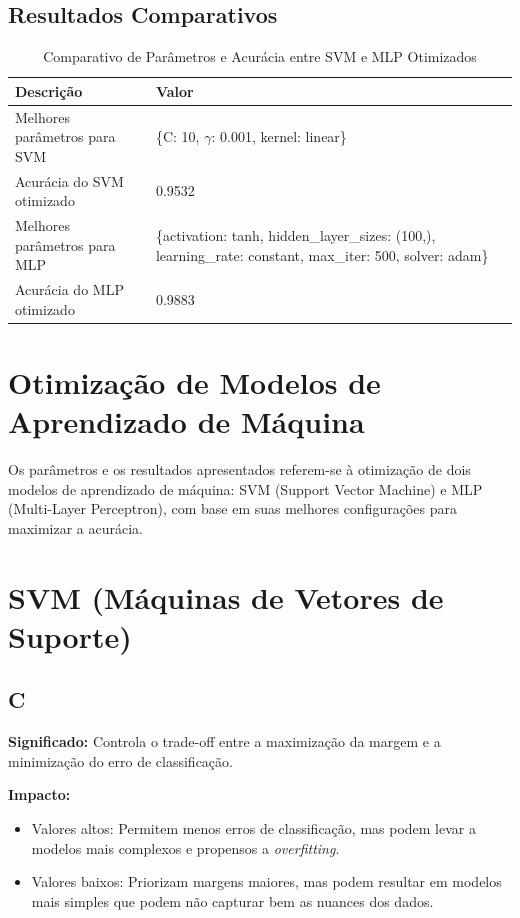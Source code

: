 \documentclass[12pt,a4paper,oneside,openany]{article}
\begin{document}
\subsection{Resultados Comparativos}

\begin{table}[ht]
\centering
\begin{tabularx}{\textwidth}{|l|X|}
\hline
\textbf{Descrição} & \textbf{Valor} \\
\hline
Melhores parâmetros para SVM & \{C: 10, $\gamma$: 0.001, kernel: linear\} \\
Acurácia do SVM otimizado & 0.9532 \\
Melhores parâmetros para MLP & \{activation: tanh, hidden\_layer\_sizes: (100,), learning\_rate: constant, max\_iter: 500, solver: adam\} \\
Acurácia do MLP otimizado & 0.9883 \\
\hline
\end{tabularx}
\caption{Comparativo de Parâmetros e Acurácia entre SVM e MLP Otimizados}
\end{table}


\section*{Otimização de Modelos de Aprendizado de Máquina}

Os parâmetros e os resultados apresentados referem-se à otimização de dois modelos de aprendizado de máquina: SVM (Support Vector Machine) e MLP (Multi-Layer Perceptron), com base em suas melhores configurações para maximizar a acurácia.

\section*{SVM (Máquinas de Vetores de Suporte)}

\subsection*{C}
\noindent\textbf{Significado:} Controla o trade-off entre a maximização da margem e a minimização do erro de classificação.  

\noindent\textbf{Impacto:}
\begin{itemize}
    \item Valores altos: Permitem menos erros de classificação, mas podem levar a modelos mais complexos e propensos a \textit{overfitting}.
    \item Valores baixos: Priorizam margens maiores, mas podem resultar em modelos mais simples que podem não capturar bem as nuances dos dados.
\end{itemize}
\end{document}
